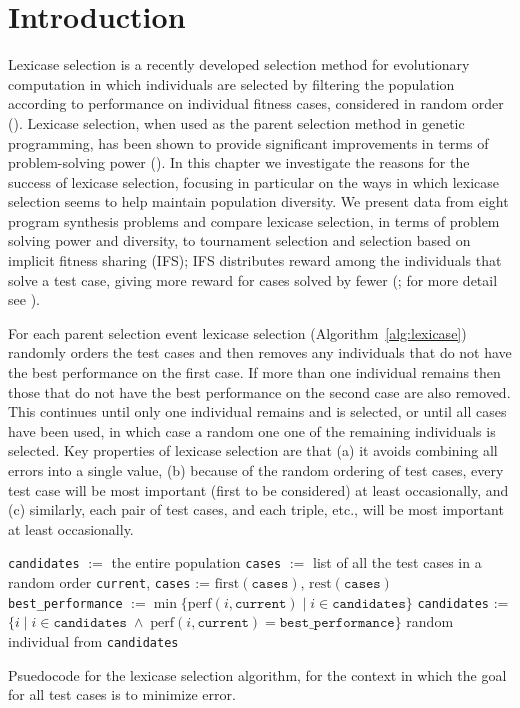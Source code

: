 \section{Introduction} \label{intro}

Lexicase selection is a recently developed selection method for  evolutionary computation in which individuals are selected by 
filtering the population according to performance on individual fitness cases, considered in random order (\cite{Spector:2012:GECCOcompA}). Lexicase 
selection, when used as the parent selection method in genetic programming, has been shown to provide 
significant improvements in terms of problem-solving power (\cite{Helmuth:2014:ieeeTEC,Helmuth:2015:GECCO}). 
In this chapter we investigate the reasons for the success of lexicase selection, focusing in particular on the 
ways in which lexicase selection seems to help maintain population diversity. We present data from eight 
program synthesis problems and compare lexicase selection, in terms of problem solving power and diversity, 
to tournament selection and selection based on implicit fitness sharing (IFS); IFS distributes reward among the individuals that solve a test case, giving more reward for cases solved by fewer (\cite{Mckay00fitnesssharing}; for more detail see \cite{Helmuth:2014:ieeeTEC}).

For each parent selection event lexicase selection (Algorithm~\ref{alg:lexicase})
randomly orders the test cases and then removes any individuals  
that do not have the best performance on the first case. 
If more than one individual remains then those that do not have the best performance on the second case are also removed. This 
 continues until only one individual remains and is selected, or until all cases 
have been used, in which case a random one one of the remaining individuals is selected.
Key properties of lexicase selection are that (a) it avoids combining all  errors into a single
 value, (b) because of the random ordering of test cases, every test case will be
most important (first to be considered) at least occasionally, and (c) similarly, each pair of test cases, and each triple, etc., will be most important at least occasionally. 

\begin{algorithm}[tb]
	\begin{algorithmic}
		\STATE \texttt{candidates} $:=$ the entire population
		\STATE \texttt{cases} $:=$ list of all the test cases in a random order
			\STATE \texttt{current}, \texttt{cases} := $\textrm{first}(\texttt{cases})$, $\textrm{rest}(\texttt{cases})$
			\STATE \texttt{best\_performance} $:= \min \{ \textrm{perf}(i, \texttt{current}) \;|\; i \in \texttt{candidates} \}$
			\STATE \texttt{candidates} := $\{ i \;|\; i \in \texttt{candidates} \;\land\; \textrm{perf}(i, \texttt{current}) = \texttt{best\_performance}\}$
		\ENDWHILE
		\RETURN random individual from \texttt{candidates}
	\end{algorithmic}
	\caption{Psuedocode for the lexicase selection algorithm, for the context in which the goal for all test cases is to minimize error.}
	\label{alg:lexicase}
\end{algorithm}



